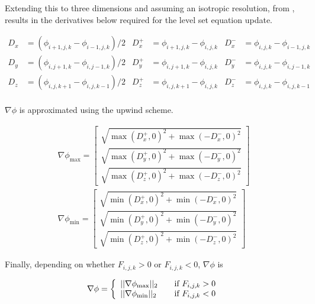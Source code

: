 Extending this to three dimensions and assuming an isotropic resolution, from \cite{Lefohn04astreaming}, results in the derivatives below required for the level set equation update. 

\begin{spacing}{1.1}
\begin{align}
	D_x &= (\phi_{i+1,j,k}-\phi_{i-1,j,k})/2 & D_x^+ &= \phi_{i+1,j,k}-\phi_{i,j,k} & D_x^- &= \phi_{i,j,k}-\phi_{i-1,j,k} \nonumber\\
	D_y &= (\phi_{i,j+1,k}-\phi_{i,j-1,k})/2 & D_y^+ &= \phi_{i,j+1,k}-\phi_{i,j,k} &	D_y^- &= \phi_{i,j,k}-\phi_{i,j-1,k} \nonumber\\
	D_z &= (\phi_{i,j,k+1}-\phi_{i,j,k-1})/2 & D_z^+ &= \phi_{i,j,k+1}-\phi_{i,j,k} &	D_z^- &= \phi_{i,j,k}-\phi_{i,j,k-1} \nonumber\\
	\label{firstorderderivatives}
\end{align}


$\nabla\phi$ is approximated using the upwind scheme.
\end{spacing}

\begin{align}
\nabla\phi_{\max} = \left[
  \begin{array}{ c }
     \sqrt{\max(D_x^+, 0)^2 + \max(-D_x^-,0)^2}  \\[2em]
     \sqrt{\max(D_y^+, 0)^2 + \max(-D_y^-,0)^2}  \\[2em]
     \sqrt{\max(D_z^+, 0)^2 + \max(-D_z^-,0)^2}  
  \end{array} \right]
\\[2em]
\nabla\phi_{\min} = \left[
  \begin{array}{ c }
     \sqrt{\min(D_x^+, 0)^2 + \min(-D_x^-,0)^2}  \\[2em]
     \sqrt{\min(D_y^+, 0)^2 + \min(-D_y^-,0)^2}  \\[2em]
     \sqrt{\min(D_z^+, 0)^2 + \min(-D_z^-,0)^2} 
  \end{array} \right]
\end{align}

Finally, depending on whether $F_{i,j,k} > 0$ or $F_{i,j,k} < 0$, $\nabla\phi$ is 

\begin{equation}
\nabla\phi = \left\{ 
\begin{array}{l l}
  ||\nabla\phi_{\max}||_2 & \quad \mbox{if $F_{i,j,k} > 0$}\\
  ||\nabla\phi_{\min}||_2 & \quad \mbox{if $F_{i,j,k} < 0$}\\ \end{array} \right.
\label{eq:finalchoice}
\end{equation}

